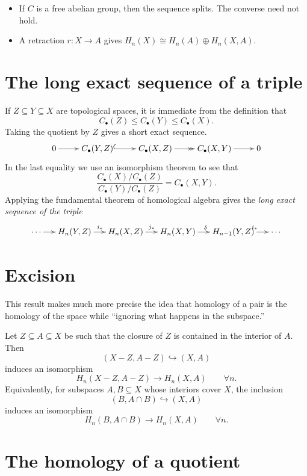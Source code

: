\begin{remark}
\begin{itemize}
\item If $C$ is a free abelian group, then
the sequence splits. The converse need not
hold.
\item A retraction $r:X\to A$ gives
$H_n(X)\cong H_n(A)\oplus H_n(X,A)$.
\end{itemize}
\end{remark}
\section{The long exact sequence of a triple}
\label{section-long-exact-triple}

If $Z\subseteq Y\subseteq X$ are topological
spaces, it is
immediate from the definition that
$$
C_\bullet(Z)\leq C_\bullet(Y)\leq
C_\bullet(X).
$$
Taking the quotient by $Z$ gives a short
exact sequence.
$$
\xymatrix{
0 \ar[r]
 & C_\bullet(Y,Z)
   \ar@{^{(}->}[r]
 & C_\bullet(X,Z)
   \ar@{->>}[r]
 & C_\bullet(X,Y) \ar[r]
 & 0
}
$$
In the last equality we use an isomorphism
theorem to see
that
$$
\frac{C_\bullet(X)/C_\bullet(Z)}
{C_\bullet(Y)/C_\bullet(Z)}
=
C_\bullet(X,Y).
$$
Applying the fundamental theorem of
homological algebra gives
the \emph{long exact sequence of the triple}
$$
\xymatrix@C=1.4em{
\cdots \ar[r]
 & H_n(Y,Z) \ar[r]^{i_*}
 & H_n(X,Z) \ar[r]^{j_*}
 & H_n(X,Y) \ar[r]^{\delta}
 & H_{n-1}(Y,Z) \ar[r]^{i_*}
 & \cdots
}
$$
\section{Excision}\label{section-excision}

This result makes much more precise the idea
that homology of
a pair is the homology of the space while
``ignoring what
happens in the subspace.''

Let $Z\subseteq A\subseteq X$ be such that
the closure of $Z$
is contained in the interior of $A$. Then
$$
(X-Z,A-Z)\hookrightarrow (X,A)
$$
induces an isomorphism
$$
H_n(X-Z,A-Z)\to H_n(X,A)
\qquad\forall n.
$$
Equivalently, for subspaces $A,B\subseteq X$
whose interiors
cover $X$, the inclusion
$$
(B,A\cap B)\hookrightarrow (X,A)
$$
induces an isomorphism
$$
H_n(B,A\cap B)\to H_n(X,A)
\qquad\forall n.
$$
\section{The homology of a quotient}
\label{section-homology-quotient}

